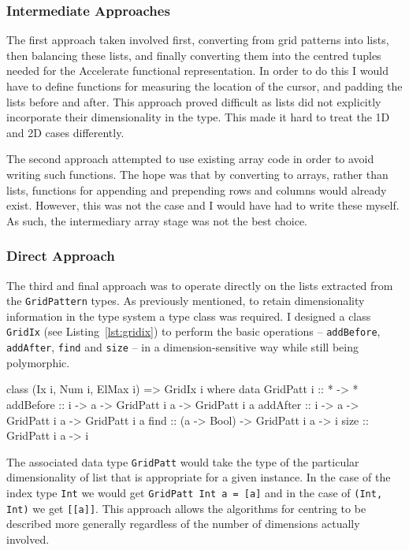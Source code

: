 \documentclass[
    12pt,
    a4paper,
    twoside,
    openright,
    ]{scrbook}
\begin{document}
\subsubsection{Intermediate Approaches}

The first approach taken involved first, converting from grid patterns into
lists, then balancing these lists, and finally converting them into the centred
tuples needed for the Accelerate functional representation. In order to do this
I would have to define functions for measuring the location of the cursor, and
padding the lists before and after. This approach proved difficult as lists did
not explicitly incorporate their dimensionality in the type. This made it hard
to treat the 1D and 2D cases differently.

The second approach attempted to use existing array code in order to avoid
writing such functions. The hope was that by converting to arrays, rather than
lists, functions for appending and prepending rows and columns would already
exist. However, this was not the case and I would have had to write these
myself. As such, the intermediary array stage was not the best choice.

\subsubsection{Direct Approach}

The third and final approach was to operate directly on the lists extracted from
the \texttt{GridPattern} types. As previously mentioned, to retain
dimensionality information in the type system a type class was required.  I
designed a class \texttt{GridIx} (see Listing~\ref{lst:gridix}) to perform the
basic operations -- \texttt{addBefore}, \texttt{addAfter}, \texttt{find} and
\texttt{size} -- in a dimension-sensitive way while still being polymorphic.

\begin{hflisting}[label={lst:gridix}, caption=The class declaration of
  \texttt{GridIx} showing the main functions defined for the grid manipulation.]
class (Ix i, Num i, ElMax i) => GridIx i where
    data GridPatt i :: * -> *
    addBefore :: i -> a -> GridPatt i a -> GridPatt i a
    addAfter :: i -> a -> GridPatt i a -> GridPatt i a
    find :: (a -> Bool) -> GridPatt i a -> i
    size :: GridPatt i a -> i
\end{hflisting}

The associated data type \texttt{GridPatt} would take the type of the particular
dimensionality of list that is appropriate for a given instance. In the case of
the index type \texttt{Int} we would get \texttt{GridPatt Int a = {[}a{]}} and
in the case of \texttt{(Int, Int)} we get \texttt{{[}{[}a{]}{]}}. This approach
allows the algorithms for centring to be described more generally regardless of
the number of dimensions actually involved.
\end{document}

